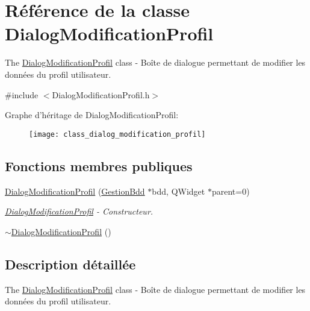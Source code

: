 \hypertarget{class_dialog_modification_profil}{\section{Référence de la classe Dialog\-Modification\-Profil}
\label{class_dialog_modification_profil}
}


The \hyperlink{class_dialog_modification_profil}{Dialog\-Modification\-Profil} class -\/ Boîte de dialogue permettant de modifier les données du profil utilisateur.  




{\ttfamily \#include $<$Dialog\-Modification\-Profil.\-h$>$}

Graphe d'héritage de Dialog\-Modification\-Profil\-:\begin{figure}[H]
\begin{center}
\leavevmode
\texttt{[image: class\_dialog\_modification\_profil]}
\end{center}
\end{figure}
\subsection*{Fonctions membres publiques}
\begin{DoxyCompactItemize}
\item 
\hyperlink{class_dialog_modification_profil_a700fb3134550ddfa98df89dfca285bb1}{Dialog\-Modification\-Profil} (\hyperlink{class_gestion_bdd}{Gestion\-Bdd} $\ast$bdd, Q\-Widget $\ast$parent=0)
\begin{DoxyCompactList}\small\item\em \hyperlink{class_dialog_modification_profil}{Dialog\-Modification\-Profil} -\/ Constructeur. \end{DoxyCompactList}\item 
\hyperlink{class_dialog_modification_profil_a5f2ede09acd9b01758e4fabe6165e964}{$\sim$\-Dialog\-Modification\-Profil} ()
\end{DoxyCompactItemize}


\subsection{Description détaillée}
The \hyperlink{class_dialog_modification_profil}{Dialog\-Modification\-Profil} class -\/ Boîte de dialogue permettant de modifier les données du profil utilisateur. 

